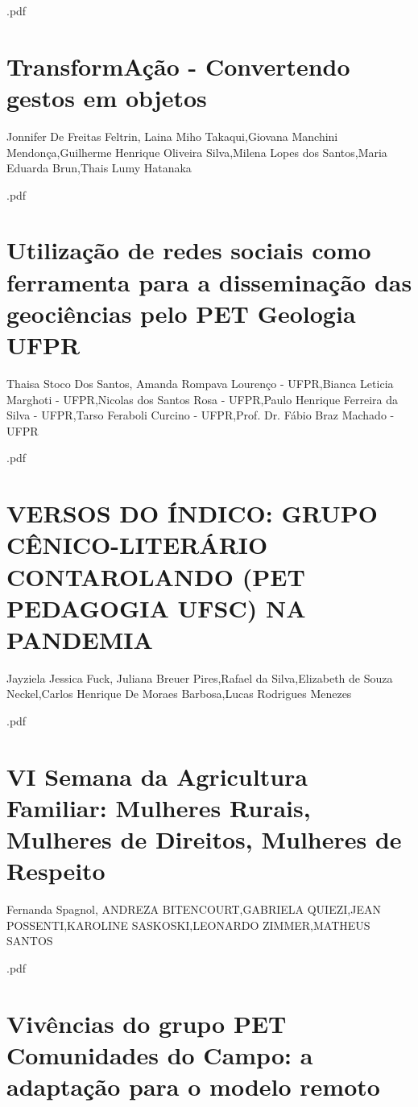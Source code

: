 

.pdf\section{TransformAção - Convertendo gestos em objetos}

Jonnifer De Freitas Feltrin, Laina Miho Takaqui,Giovana Manchini Mendonça,Guilherme Henrique Oliveira Silva,Milena Lopes dos Santos,Maria Eduarda Brun,Thais Lumy Hatanaka



.pdf\section{Utilização de redes sociais como ferramenta para a disseminação das geociências pelo PET Geologia UFPR}

Thaisa Stoco Dos Santos, Amanda Rompava Lourenço - UFPR,Bianca Leticia Marghoti - UFPR,Nicolas dos Santos Rosa - UFPR,Paulo Henrique Ferreira da Silva - UFPR,Tarso Feraboli Curcino - UFPR,Prof. Dr. Fábio Braz Machado - UFPR



.pdf\section{VERSOS DO ÍNDICO: GRUPO CÊNICO-LITERÁRIO CONTAROLANDO (PET  PEDAGOGIA UFSC) NA PANDEMIA}

Jayziela Jessica Fuck, Juliana Breuer Pires,Rafael da Silva,Elizabeth de  Souza Neckel,Carlos Henrique De Moraes Barbosa,Lucas Rodrigues Menezes



.pdf\section{VI Semana da Agricultura Familiar: Mulheres Rurais, Mulheres de Direitos, Mulheres de Respeito}

Fernanda Spagnol, ANDREZA BITENCOURT,GABRIELA QUIEZI,JEAN POSSENTI,KAROLINE SASKOSKI,LEONARDO ZIMMER,MATHEUS SANTOS



.pdf\section{Vivências do grupo PET Comunidades do Campo: a adaptação para o modelo remoto }

